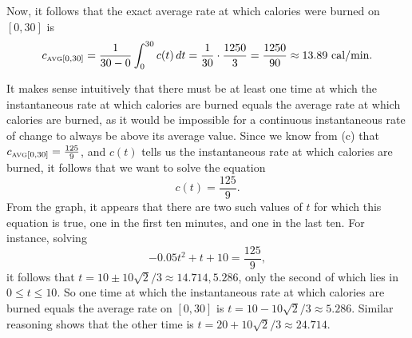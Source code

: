 \begin{activitySolution}
	Now, it follows that the exact average rate at which calories were burned on $[0,30]$ is
	$$c_{\mbox{\tiny{AVG}}[0,30]} = \frac{1}{30-0} \int_0^{30} c(t) \, dt = \frac{1}{30} \cdot \frac{1250}{3} = \frac{1250}{90} \approx 13.89 \ \mbox{cal/min}.$$
	\item It makes sense intuitively that there must be at least one time at which the instantaneous rate at which calories are burned equals the average rate at which calories are burned, as it would be impossible for a continuous instantaneous rate of change to always be above its average value.  Since we know from (c) that $c_{\mbox{\tiny{AVG}}[0,30]} = \frac{125}{9}$, and $c(t)$ tells us the instantaneous rate at which calories are burned, it follows that we want to solve the equation
	$$c(t) = \frac{125}{9}.$$
From the graph, it appears that there are two such values of $t$ for which this equation is true, one in the first ten minutes, and one in the last ten.  For instance, solving
$$-0.05t^2 + t + 10 = \frac{125}{9},$$
it follows that $t = 10 \pm 10\sqrt{2}/3 \approx 14.714, 5.286$, only the second of which lies in $0 \le t \le 10$.  So one time at which the instantaneous rate at which calories are burned equals the average rate on $[0,30]$ is $t = 10 - 10\sqrt{2}/3 \approx 5.286.$  Similar reasoning shows that the other time is $t = 20 + 10\sqrt{2}/3 \approx 24.714$.
\ea
\end{activitySolution}
\aftera





